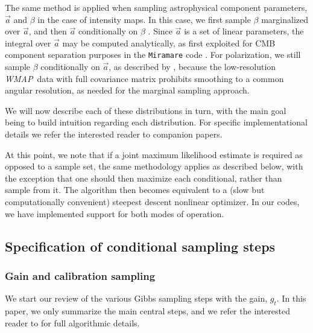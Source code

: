 \documentclass[twocolumn]{aa}
\def\WMAP{\emph{WMAP}}
\renewcommand{\a}[0]{\vec{a}}
\begin{document}
The same method is applied when sampling astrophysical component
parameters, $\a$ and $\beta$ in the case of intensity maps. In this case, we first
sample $\beta$ marginalized over $\a$, and then $\a$ conditionally on
$\beta$ \citep{bp13}. Since $\a$ is a set of linear parameters, the
integral over $\a$ may be computed analytically, as first exploited
for CMB component separation purposes in the \texttt{Miramare} code
\citep{stompor:2008,stivoli:2010}. For polarization, we still sample
$\beta$ conditionally on $\a$, as described by \citet{bp14}, because
the low-resolution \WMAP\ data with full covariance matrix prohibits
smoothing to a common angular resolution, as needed for the marginal
sampling approach.

We will now describe each of these distributions in turn, with the
main goal being to build intuition regarding each distribution. For
specific implementational details we refer the interested reader to
companion papers.

At this point, we note that if a joint maximum likelihood estimate is
required as opposed to a sample set, the same methodology applies as
described below, with the exception that one should then maximize each
conditional, rather than sample from it. The algorithm then becomes
equivalent to a (slow but computationally convenient) steepest descent
nonlinear optimizer. In our codes, we have implemented support for
both modes of operation.

\subsection{Specification of conditional sampling steps}
\label{sec:conditionals}

\subsubsection{Gain and calibration sampling}
\label{sec:gain}

We start our review of the various Gibbs sampling steps with the gain,
$g_t$. In this paper, we only summarize the main central steps, and we
refer the interested reader to \citet{bp07} for full algorithmic
details.
\end{document}

